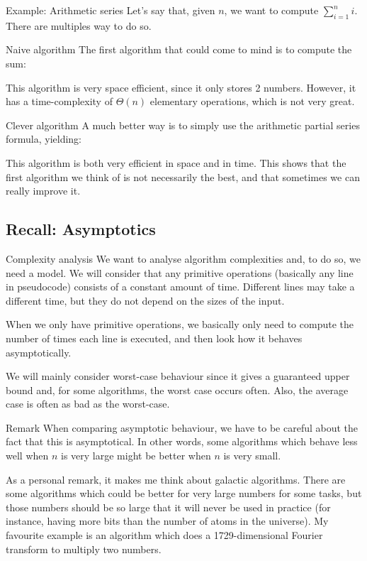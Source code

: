 \documentclass[a4paper]{article}
\begin{document}
\begin{parag}{Example: Arithmetic series}
    Let's say that, given $n$, we want to compute $\sum_{i=1}^{n} i$. There are multiples way to do so.

    \begin{subparag}{Naive algorithm}
        The first algorithm that could come to mind is to compute the sum:
        
        This algorithm is very space efficient, since it only stores 2 numbers. However, it has a time-complexity of $\Theta\left(n\right)$ elementary operations, which is not very great.
    \end{subparag}

    \begin{subparag}{Clever algorithm}
        A much better way is to simply use the arithmetic partial series formula, yielding: 
        
        This algorithm is both very efficient in space and in time. This shows that the first algorithm we think of is not necessarily the best, and that sometimes we can really improve it.
    \end{subparag}
\end{parag}

\subsection{Recall: Asymptotics}
\begin{parag}{Complexity analysis}
    We want to analyse algorithm complexities and, to do so, we need a model. We will consider that any primitive operations (basically any line in pseudocode) consists of a constant amount of time. Different lines may take a different time, but they do not depend on the sizes of the input. 

    When we only have primitive operations, we basically only need to compute the number of times each line is executed, and then look how it behaves asymptotically. 

    We will mainly consider worst-case behaviour since it gives a guaranteed upper bound and, for some algorithms, the worst case occurs often. Also, the average case is often as bad as the worst-case.

    \begin{subparag}{Remark}
        When comparing asymptotic behaviour, we have to be careful about the fact that this is asymptotical. In other words, some algorithms which behave less well when $n$ is very large might be better when $n$ is very small.

        As a personal remark, it makes me think about galactic algorithms. There are some algorithms which could be better for very large numbers for some tasks, but those numbers should be so large that it will never be used in practice (for instance, having more bits than the number of atoms in the universe). My favourite example is an algorithm which does a 1729-dimensional Fourier transform to multiply two numbers.
    \end{subparag}
    
\end{parag}
\end{document}
